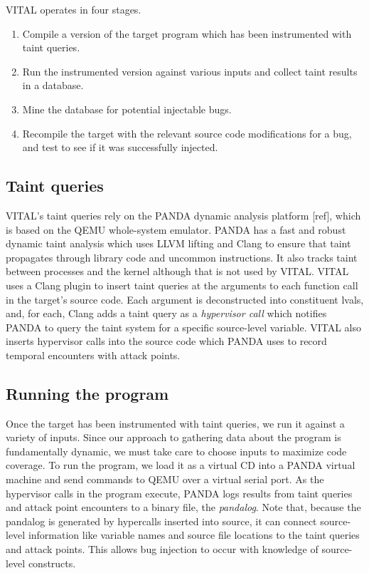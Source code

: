 VITAL operates in four stages.

\begin{enumerate}
\item Compile a version of the target program which has been instrumented with taint queries.
\item Run the instrumented version against various inputs and collect taint results  in a database.
\item Mine the database for potential injectable bugs.
\item Recompile the target with the relevant source code modifications for a bug, and test to see if it was successfully injected.
\end{enumerate}

\subsection{Taint queries}
VITAL's taint queries rely on the PANDA dynamic analysis platform [ref], which is based on the QEMU whole-system emulator.
PANDA has a fast and robust dynamic taint analysis which uses LLVM lifting and Clang to ensure that taint propagates through library code and uncommon instructions.
It also tracks taint between processes and the kernel although that is not used by VITAL.
VITAL uses a Clang plugin to insert taint queries at the arguments to each function call in the target's source code.
Each argument is deconstructed into constituent lvals, and, for each, Clang adds a taint query as a \emph{hypervisor call} which notifies PANDA to query the taint system for a specific source-level variable.
VITAL also inserts hypervisor calls into the source code which PANDA uses to record temporal encounters with attack points.

\subsection{Running the program}
Once the target has been instrumented with taint queries, we run it against a variety of inputs.
Since our approach to gathering data about the program is fundamentally dynamic, we must take care to choose inputs to maximize code coverage.
To run the program, we load it as a virtual CD into a PANDA virtual machine and send commands to QEMU over a virtual serial port.
As the hypervisor calls in the program execute, PANDA logs results from taint queries and attack point encounters to a binary file, the \emph{pandalog}.
Note that, because the pandalog is generated by hypercalls inserted into source, it can connect source-level information like variable names and source file locations to the taint queries and attack points.
This allows bug injection to occur with knowledge of source-level constructs. 


